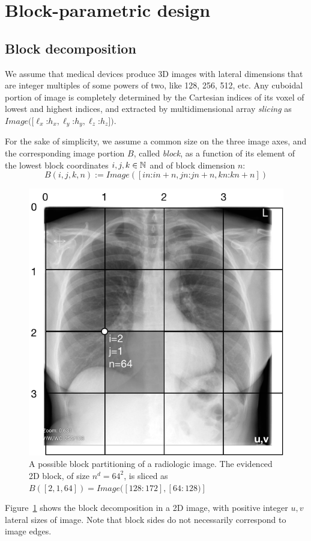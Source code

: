 

\section{Block-parametric design}\label{sec:filter}

\subsection{Block decomposition}\label{sec:bbbb}

We assume that medical devices produce 3D images with lateral dimensions that are integer multiples of some powers of two, like 128, 256, 512, etc.
Any cuboidal portion of image is completely determined by the Cartesian indices of its voxel of lowest and highest indices, and extracted by multidimensional array \emph{slicing} as $Image([\ell_x$:$h_x, \ell_y$:$h_y, \ell_z$:$h_z])$.

For the sake of simplicity, we assume a common size on the three image axes, and the corresponding image portion $B$, called \emph{block}, as a function of its element of the  lowest  block  coordinates $i,j,k\in\mathbb{N}$ and of block dimension $n$:
\[
B(i,j,k,n) := Image([in\mbox{:}in+n, jn\mbox{:}jn+n, kn\mbox{:}kn+n]) 
\]

\begin{figure}[htbp] %
   \centering
   \includegraphics[width=0.5\linewidth]{figs/blocks} 
   \caption{A possible block partitioning of a radiologic image. The evidenced 2D block, of size $n^d=64^2$, is sliced as $B([2,1,64]) = Image([128:172],[64:128)]$}
   \label{fig:blocks}
\end{figure}


Figure~\ref{fig:blocks} shows the block decomposition in a 2D image, with positive integer $u,v$ lateral sizes of image. Note that block sides do not necessarily correspond to image edges. 


